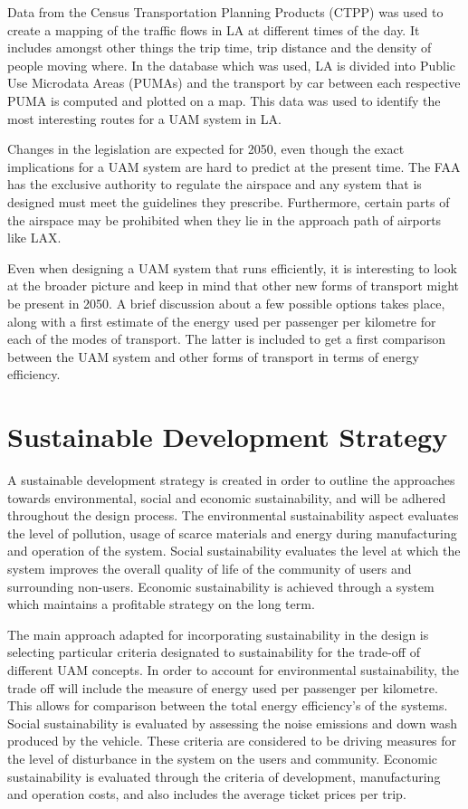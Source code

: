 Data from the Census Transportation Planning Products (CTPP) was used to create a mapping of the traffic flows in LA at different times of the day. It includes amongst other things the trip time, trip distance and the density of people moving where. In the database which was used, LA is divided into Public Use Microdata Areas (PUMAs) and the transport by car between each respective PUMA is computed and plotted on a map. This data was used to identify the most interesting routes for a UAM system in LA. 

Changes in the legislation are expected for 2050, even though the exact implications for a UAM system are hard to predict at the present time. The FAA has the exclusive authority to regulate the airspace and any system that is designed must meet the guidelines they prescribe. Furthermore, certain parts of the airspace may be prohibited when they lie in the approach path of airports like LAX. 

Even when designing a UAM system that runs efficiently, it is interesting to look at the broader picture and keep in mind that other new forms of transport might be present in 2050. A brief discussion about a few possible options takes place, along with a first estimate of the energy used per passenger per kilometre for each of the modes of transport. The latter is included to get a first comparison between the UAM system and other forms of transport in terms of energy efficiency. 

\section{Sustainable Development Strategy}
A sustainable development strategy is created in order to outline the approaches towards environmental, social and economic sustainability, and will be adhered throughout the design process. The environmental sustainability aspect evaluates the level of pollution, usage of scarce materials and energy during manufacturing and operation of the system. Social sustainability evaluates the level at which the system improves the overall quality of life of the community of users and surrounding non-users. Economic sustainability is achieved through a system which maintains a profitable strategy on the long term.

The main approach adapted for incorporating sustainability in the design is selecting particular criteria designated to sustainability for the trade-off of different UAM concepts. In order to account for environmental sustainability, the trade off will include the measure of energy used per passenger per kilometre. This allows for comparison between the total energy efficiency's of the systems. Social sustainability is evaluated by assessing the noise emissions and down wash produced by the vehicle. These criteria are considered to be driving measures for the level of disturbance in the system on the users and community. Economic sustainability is evaluated through the criteria of development, manufacturing and operation costs, and also includes the average ticket prices per trip.


